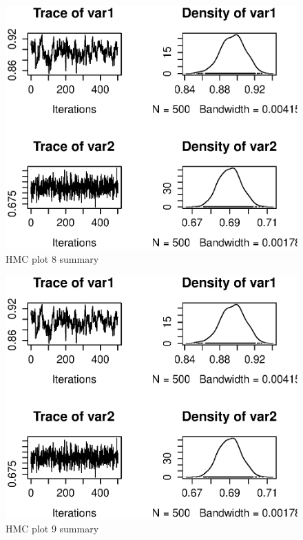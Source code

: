 \documentclass[a4paper,11pt]{article}
\begin{document}
\begin{figure}[h]
\centering
\includegraphics[width=140mm]{hmcplot_mcmc8.eps}
\caption{HMC plot 8 summary}
\end{figure}

\begin{figure}[h]
\centering
\includegraphics[width=140mm]{hmcplots9_mcmc.eps}
\caption{HMC plot 9 summary}
\end{figure}
\end{document}
